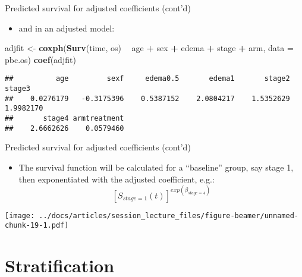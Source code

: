 \documentclass[
  ignorenonframetext,
]{beamer}
\newenvironment{Shaded}{\begin{snugshade}}{\end{snugshade}}
\newcommand{\DataTypeTok}[1]{\textcolor[rgb]{0.13,0.29,0.53}{#1}}
\newcommand{\KeywordTok}[1]{\textcolor[rgb]{0.13,0.29,0.53}{\textbf{#1}}}
\newcommand{\NormalTok}[1]{#1}
\newcommand{\OperatorTok}[1]{\textcolor[rgb]{0.81,0.36,0.00}{\textbf{#1}}}
\newcommand{\StringTok}[1]{\textcolor[rgb]{0.31,0.60,0.02}{#1}}
\providecommand{\tightlist}{%
  \setlength{\itemsep}{0pt}\setlength{\parskip}{0pt}}
\begin{document}
\begin{frame}[fragile]{Predicted survival for adjusted coefficients
(cont'd)}
\protect\hypertarget{predicted-survival-for-adjusted-coefficients-contd}{}

\begin{itemize}
\tightlist
\item
  and in an adjusted model:
\end{itemize}

\footnotesize

\begin{Shaded}
\begin{Highlighting}[]
\NormalTok{adjfit <-}\StringTok{ }\KeywordTok{coxph}\NormalTok{(}\KeywordTok{Surv}\NormalTok{(time, os) }\OperatorTok{~}\StringTok{ }\NormalTok{age }\OperatorTok{+}\StringTok{ }\NormalTok{sex }\OperatorTok{+}\StringTok{ }\NormalTok{edema}
                \OperatorTok{+}\StringTok{ }\NormalTok{stage }\OperatorTok{+}\StringTok{ }\NormalTok{arm, }\DataTypeTok{data =}\NormalTok{ pbc.os)}
\KeywordTok{coef}\NormalTok{(adjfit)}
\end{Highlighting}
\end{Shaded}

\begin{verbatim}
##          age         sexf     edema0.5       edema1       stage2       stage3 
##    0.0276179   -0.3175396    0.5387152    2.0804217    1.5352629    1.9982170 
##       stage4 armtreatment 
##    2.6662626    0.0579460
\end{verbatim}

\end{frame}

\begin{frame}{Predicted survival for adjusted coefficients (cont'd)}
\protect\hypertarget{predicted-survival-for-adjusted-coefficients-contd-1}{}

\begin{itemize}
\tightlist
\item
  The survival function will be calculated for a ``baseline'' group, say
  stage 1, then exponentiated with the adjusted coefficient, e.g.: \[
  [S_{stage=1}(t)]^{exp(\beta_{stage=4})}
  \]
\end{itemize}

\texttt{[image: ../docs/articles/session\_lecture\_files/figure-beamer/unnamed-chunk-19-1.pdf]}

\end{frame}

\hypertarget{stratification}{%
\section{Stratification}\label{stratification}}
\end{document}
